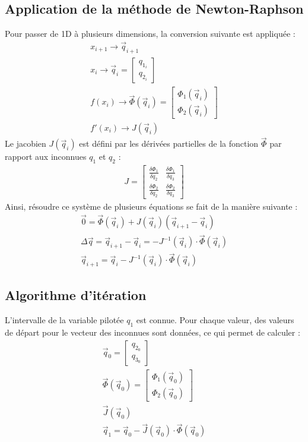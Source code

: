 \documentclass[12pt,a4paper]{article}
\begin{document}
\subsection{Application de la méthode de Newton-Raphson}
Pour passer de 1D à plusieurs dimensions, la conversion suivante est appliquée : 
\begin{eqnarray}
x_{i+1} \rightarrow \vec{q}_{i+1}\\
x_{i} \rightarrow \vec{q}_{i}=\begin{bmatrix}
q_{1_i} \\
q_{2_i} 
\end{bmatrix}\\
f(x_i) \rightarrow \vec{\Phi}(\vec{q}_{i})=\begin{bmatrix}
\Phi_{1}(\vec{q}_{i}) \\
\Phi_{2}(\vec{q}_{i}) 
\end{bmatrix}\\
f'(x_i) \rightarrow J(\vec{q}_{i})
\end{eqnarray}
Le jacobien $J(\vec{q}_{i})$ est défini par les dérivées partielles de la fonction $\vec{\Phi}$ par rapport aux inconnues $q_1$ et $q_2$ : 
\begin{eqnarray}
J=
\begin{bmatrix}
\frac{\delta \Phi_1}{\delta q_2} & \frac{\delta \Phi_1}{\delta q_3}\\
\frac{\delta \Phi_2}{\delta q_2} & \frac{\delta \Phi_2}{\delta q_3}
\end{bmatrix}
\end{eqnarray}
Ainsi, résoudre ce système de plusieurs équations se fait de la manière suivante : 
\begin{eqnarray}
\vec{0} = \vec{\Phi}(\vec{q}_i) + J(\vec{q}_i) (\vec{q}_{i+1}-\vec{q}_i)\\
\Delta \vec{q} = \vec{q}_{i+1}-\vec{q}_i =  -J^{-1}(\vec{q}_i) \cdot \vec{\Phi}(\vec{q}_i)\\
\vec{q}_{i+1}=\vec{q}_{i}-J^{-1}(\vec{q}_i) \cdot \vec{\Phi}(\vec{q}_i)
\end{eqnarray}

\subsection{Algorithme d'itération}
L'intervalle de la variable pilotée $q_1$ est connue. Pour chaque valeur, des valeurs de départ pour le vecteur des inconnues sont données, ce qui permet de calculer :
\begin{eqnarray}
\vec{q}_{0}=\begin{bmatrix}
q_{2_0} \\
q_{3_0} 
\end{bmatrix}\\
\vec{\Phi}(\vec{q}_{0})=\begin{bmatrix}
\Phi_{1}(\vec{q}_{0}) \\
\Phi_{2}(\vec{q}_{0}) 
\end{bmatrix}\\
\vec{J}(\vec{q}_{0})\\
\vec{q}_{1}=\vec{q}_{0} - \vec{J}(\vec{q}_{0}) \cdot \vec{\Phi}(\vec{q}_{0})
\end{eqnarray}
\end{document}
